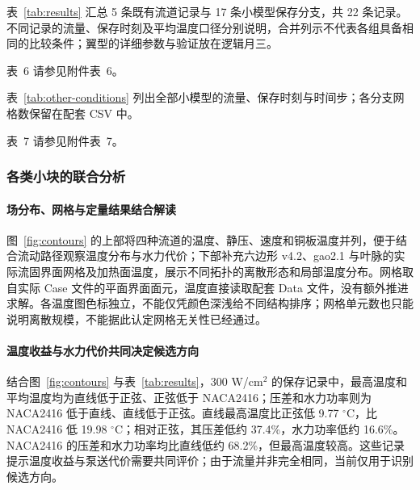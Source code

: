 \documentclass[stage2,fontset=fandol]{ydzjreport}
\makeatletter
\newcommand{\submissionnumber}[1]{\def\@currentlabel{#1}}
\makeatother
\begin{document}
表~\ref{tab:results} 汇总 5 条既有流道记录与 17 条小模型保存分支，共 22 条记录。不同记录的流量、保存时刻及平均温度口径分别说明，合并列示不代表各组具备相同的比较条件；翼型的详细参数与验证放在逻辑月三。


\begingroup
\small
\renewcommand{\arraystretch}{1.05}
\setlength{\tabcolsep}{4pt}
\setlength{\LTleft}{0pt}
\setlength{\LTright}{0pt plus 1fill}

\par\noindent \begingroup\submissionnumber{6}\label{tab:results}\endgroup 表~6 请参见附件表~6。\par

\endgroup

表~\ref{tab:other-conditions} 列出全部小模型的流量、保存时刻与时间步；各分支网格数保留在配套 CSV 中。


\par\noindent \begingroup\submissionnumber{7}\label{tab:other-conditions}\endgroup 表~7 请参见附件表~7。\par


\subsubsection{各类小块的联合分析}
\paragraph{场分布、网格与定量结果结合解读}
图~\ref{fig:contours} 的上部将四种流道的温度、静压、速度和铜板温度并列，便于结合流动路径观察温度分布与水力代价；下部补充六边形 v4.2、gao2.1 与叶脉的实际流固界面网格及加热面温度，展示不同拓扑的离散形态和局部温度分布。网格取自实际 Case 文件的平面界面面元，温度直接读取配套 Data 文件，没有额外推进求解。各温度图色标独立，不能仅凭颜色深浅给不同结构排序；网格单元数也只能说明离散规模，不能据此认定网格无关性已经通过。

\paragraph{温度收益与水力代价共同决定候选方向}
结合图~\ref{fig:contours} 与表~\ref{tab:results}，300 W/cm$^2$ 的保存记录中，最高温度和平均温度均为直线低于正弦、正弦低于 NACA2416；压差和水力功率则为 NACA2416 低于直线、直线低于正弦。直线最高温度比正弦低 9.77 $^\circ$C，比 NACA2416 低 19.98 $^\circ$C；相对正弦，其压差低约 37.4\%，水力功率低约 16.6\%。NACA2416 的压差和水力功率均比直线低约 68.2\%，但最高温度较高。这些记录提示温度收益与泵送代价需要共同评价；由于流量并非完全相同，当前仅用于识别候选方向。
\end{document}
